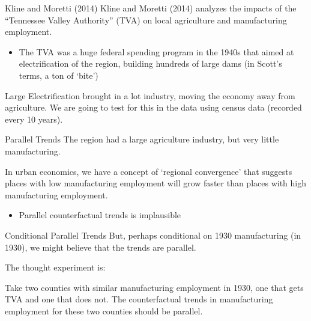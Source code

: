 \documentclass[t]{beamer}
\begin{document}
\begin{frame}{Kline and Moretti (2014)}
  Kline and Moretti (2014) analyzes the impacts of the ``Tennessee Valley Authority'' (TVA) on local agriculture and manufacturing employment.


  \begin{itemize}
    \item The TVA was a huge federal spending program in the 1940s that aimed at
    electrification of the region, building hundreds of large dams (in Scott's terms, a ton of `bite')
  \end{itemize}

  \bigskip
  Large Electrification brought in a lot industry, moving the economy away from agriculture. We are going to test for this in the data using census data (recorded every 10 years).
\end{frame}


\begin{frame}{Parallel Trends}
  The region had a large agriculture industry, but very little
  manufacturing.

  \bigskip
  In urban economics, we have a concept of `regional convergence' that suggests places with low manufacturing employment will grow faster than places with high manufacturing employment.
  \begin{itemize}
    \item Parallel counterfactual trends is implausible
  \end{itemize}

\end{frame}

\begin{frame}{Conditional Parallel Trends}
  But, perhaps conditional on 1930 manufacturing (in 1930), we might believe that the trends are parallel.

  \bigskip
  The thought experiment is:

  \begin{tcolorbox}[boxrule = 0pt, frame hidden, sharp corners, enhanced, borderline west = {2pt}{0pt}{alice}, interior hidden]
    Take two counties with similar manufacturing employment in 1930, one that gets TVA and one that does not. The counterfactual trends in manufacturing employment for these two counties should be parallel.
  \end{tcolorbox}
\end{frame}
\end{document}
